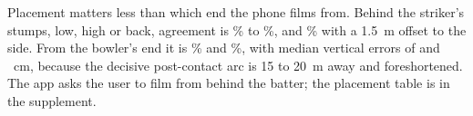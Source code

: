 Placement matters less than which end the phone films from. Behind the striker's stumps, low, high or back,
agreement is \CamStrikerMinAgree\% to \CamStrikerMaxAgree\%, and \CamStrikerSideAgree\% with a 1.5~m offset
to the side. From the bowler's end it is \CamBowlerRefAgree\% and \CamBowlerSideAgree\%, with median vertical
errors of \CamBowlerRefMedZ{} and \CamBowlerSideMedZ~cm, because the decisive post-contact arc is 15 to 20~m
away and foreshortened. The app asks the user to film from behind the batter; the placement table is in the
supplement.
